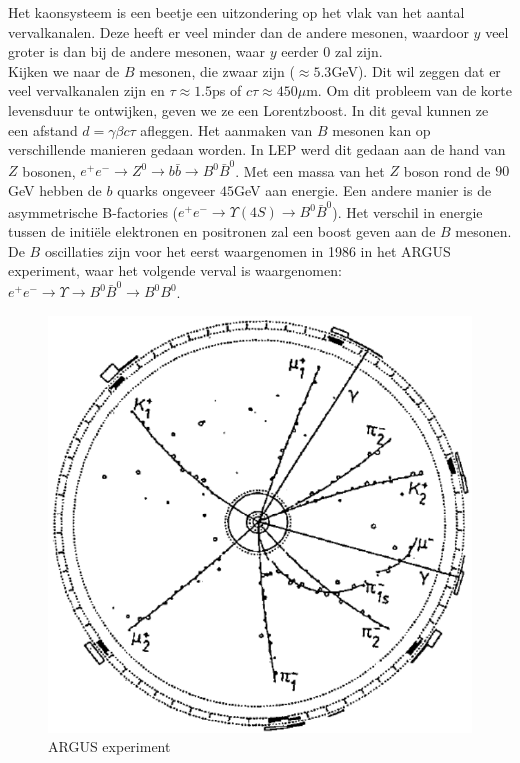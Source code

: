\documentclass[../main.tex]{subfiles}
\begin{document}
Het kaonsysteem is een beetje een uitzondering op het vlak van het aantal vervalkanalen. Deze heeft er veel minder dan de andere mesonen, waardoor $y$ veel groter is dan bij de andere mesonen, waar $y$ eerder 0 zal zijn.\\
Kijken we naar de $B$ mesonen, die zwaar zijn ($\approx 5.3$GeV). Dit wil zeggen dat er veel vervalkanalen zijn en $\tau \approx 1.5$ps of $c\tau \approx 450\mu$m. Om dit probleem van de korte levensduur te ontwijken, geven we ze een Lorentzboost. In dit geval kunnen ze een afstand $d=\gamma\beta c\tau$ afleggen. Het aanmaken van $B$ mesonen kan op verschillende manieren gedaan worden. In LEP werd dit gedaan aan de hand van $Z$ bosonen, $e^{+} e^{-} \rightarrow Z^{0} \rightarrow b \bar{b} \rightarrow B^{0} \bar{B}^{0}$. Met een massa van het $Z$ boson rond de $90$GeV hebben de $b$ quarks ongeveer $45$GeV aan energie. Een andere manier is de asymmetrische B-factories ($e^{+} e^{-} \rightarrow \Upsilon(4 S) \rightarrow B^{0} \bar{B}^{0}$). Het verschil in energie tussen de initiële elektronen en positronen zal een boost geven aan de $B$ mesonen. De $B$ oscillaties zijn voor het eerst waargenomen in 1986 in het ARGUS experiment, waar het volgende verval is waargenomen: $e^{+} e^{-} \rightarrow \Upsilon \rightarrow B^{0} \bar{B}^{0} \rightarrow B^{0} B^{0}$.

\begin{figure}[h]
    \centering
    \includegraphics[width=0.4\linewidth]{meson_mixing_and_oscillations/argus.png}
    \caption{ARGUS experiment}%
    \label{fig:meson_mixing_and_oscillations/argus}
\end{figure}
\end{document}
